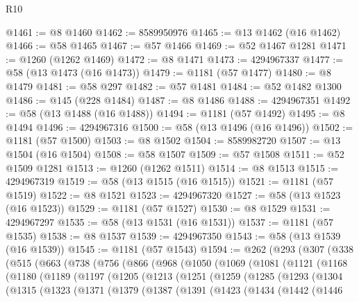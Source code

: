 \begin{lexlean}{R10}
\begin{coremodule}
@1461 := @8 @1460
@1462 := 8589950976
@1465 := @13 @1462 (@16 @1462)
@1466 := @58 @1465
@1467 := @57 @1466
@1469 := @52 @1467 @1281
@1471 := @1260 (@1262 @1469)
@1472 := @8 @1471
@1473 := 4294967337
@1477 := @58 (@13 @1473 (@16 @1473))
@1479 := @1181 (@57 @1477)
@1480 := @8 @1479
@1481 := @58 @297
@1482 := @57 @1481
@1484 := @52 @1482 @1300
@1486 := @145 (@228 @1484)
@1487 := @8 @1486
@1488 := 4294967351
@1492 := @58 (@13 @1488 (@16 @1488))
@1494 := @1181 (@57 @1492)
@1495 := @8 @1494
@1496 := 4294967316
@1500 := @58 (@13 @1496 (@16 @1496))
@1502 := @1181 (@57 @1500)
@1503 := @8 @1502
@1504 := 8589982720
@1507 := @13 @1504 (@16 @1504)
@1508 := @58 @1507
@1509 := @57 @1508
@1511 := @52 @1509 @1281
@1513 := @1260 (@1262 @1511)
@1514 := @8 @1513
@1515 := 4294967319
@1519 := @58 (@13 @1515 (@16 @1515))
@1521 := @1181 (@57 @1519)
@1522 := @8 @1521
@1523 := 4294967320
@1527 := @58 (@13 @1523 (@16 @1523))
@1529 := @1181 (@57 @1527)
@1530 := @8 @1529
@1531 := 4294967297
@1535 := @58 (@13 @1531 (@16 @1531))
@1537 := @1181 (@57 @1535)
@1538 := @8 @1537
@1539 := 4294967350
@1543 := @58 (@13 @1539 (@16 @1539))
@1545 := @1181 (@57 @1543)
@1594 := @262
    (@293
      (@307
        (@338
          (@515
            (@663
              (@738
                (@756
                  (@866
                    (@968
                      (@1050
                        (@1069
                          (@1081
                            (@1121
                              (@1168
                                (@1180
                                  (@1189
                                    (@1197
                                      (@1205
                                        (@1213
                                          (@1251
                                            (@1259
                                              (@1285
                                                (@1293
                                                  (@1304
                                                    (@1315
                                                      (@1323
                                                        (@1371
                                                          (@1379
                                                            (@1387
                                                              (@1391
                                                                (@1423
                                                                  (@1434
                                                                    (@1442
                                                                      (@1446

\end{coremodule}
\end{lexlean}
